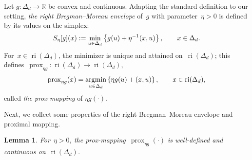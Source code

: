 \documentclass[11pt]{article}
\numberwithin{equation}{section}
\newtheorem{lemma}[theorem]{Lemma}
\theoremstyle{remark}
\newcommand{\R}{\mathbb{R}}
\newcommand{\ones}{\mathsf{1}_d}
\newcommand{\ri}{\operatorname{ri}}
\newcommand{\Env}{S}
\let\Div\relax\newcommand{\Div}{D_h}
\let\Dh\Div
\newcommand{\Simp}{\Delta_d}
\newcommand{\prox}{\operatorname{prox}}
\DeclareMathOperator*{\argmin}{\arg\!\min}
\newcommand{\1}{\mathbf{1}}
\newcommand{\bnabla}{\nabla}
\begin{document}
Let $g: \Simp \to \mathbb{R}$ be convex and continuous.
Adapting the standard definition to our setting, {\em the right Bregman--Moreau envelope} of~$g$ with parameter~$\eta > 0$ is defined by its values on the simplex:
\begin{equation}
\label{eq:envelope}
\Env_\eta[g](x) := \min_{u \in \Simp}
\left\{g(u)+\eta^{-1} \Dh(x,u)\right\},
\qquad x \in \Simp.
\end{equation}
For~$x \in \ri(\Simp)$, the minimizer is unique and attained on~$\ri(\Simp)$; 
this defines~$\prox_{\eta g}: \ri(\Simp) \to \ri(\Simp)$,
\begin{equation}
\label{eq:prox}
\prox_{\eta g}(x) = \argmin_{u \in \Simp} \left\{ \eta g(u) + \Div(x,u) \right\}, \qquad x \in \ri(\Simp),
\end{equation}
called {\em the prox-mapping} of $\eta g(\cdot)$.
%

Next, we collect some properties of the right Bregman--Moreau envelope and proximal mapping.

\begin{lemma}
\label{lem:prox-mapping}
For~$\eta > 0$, the prox-mapping~$\prox_{\eta g}(\cdot)$ is well-defined and continuous on~$\ri(\Simp)$.
\end{lemma}
\end{document}
